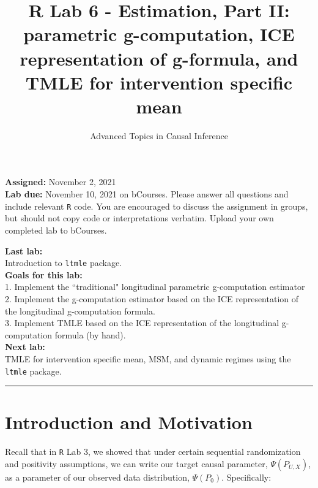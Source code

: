 \documentclass[answers]{exam}
\title{R Lab 6 - Estimation, Part II: parametric g-computation, ICE representation of g-formula, and TMLE for intervention specific mean}
\author{Advanced Topics in Causal Inference}
\date{}
\begin{document}
\maketitle



\maketitle
\noindent \textbf{Assigned:} November 2, 2021\\
\textbf{Lab due:} November 10, 2021 on bCourses. Please answer all questions and include relevant \texttt{R} code. You are encouraged to discuss the assignment in groups, but should not copy code or interpretations verbatim. Upload your own completed lab to bCourses.



\noindent \textbf{Last lab:} \\ 
Introduction to \texttt{ltmle} package.\\


\noindent \textbf{Goals for this lab:} \\
1. Implement the ``traditional" longitudinal parametric g-computation estimator \\
2. Implement the g-computation estimator based on the ICE representation of the longitudinal g-computation formula. \\
3. Implement TMLE based on the ICE representation of the longitudinal g-computation formula (by hand). \\


\noindent \textbf{Next lab:}\\
TMLE for intervention specific mean, MSM, and dynamic regimes using the \texttt{ltmle} package.

\begin{center}
\noindent\rule{18cm}{0.4pt}
\end{center}

\section{Introduction and Motivation}



Recall that in \texttt{R} Lab 3, we showed that under certain sequential randomization and positivity assumptions, we can write our target causal parameter, $\Psi(P_{U,X})$, as a parameter of our observed data distribution, $\Psi(P_0)$. Specifically:
\end{document}
